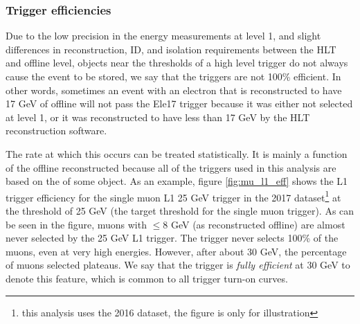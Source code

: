     \subsubsection{Trigger efficiencies} \label{sec:trigger_efficiencies}
    Due to the low precision in the energy measurements at level 1, and slight differences in reconstruction, ID, and isolation requirements between the HLT and offline level, objects near the \pt thresholds of a high level trigger do not always cause the event to be stored, we say that the triggers are not 100\% efficient. In other words, sometimes an event with an electron that is reconstructed to have 17 GeV of \pt offline will not pass the Ele17 trigger because it was either not selected at level 1, or it was reconstructed to have less \pt than 17 GeV by the HLT reconstruction software.

    The rate at which this occurs can be treated statistically. It is mainly a function of the offline reconstructed \pt because all of the triggers used in this analysis are based on the \pt of some object. As an example, figure \ref{fig:mu_l1_eff} shows the L1 trigger efficiency for the single muon L1 25 GeV trigger in the 2017 dataset\footnote{this analysis uses the 2016 dataset, the figure is only for illustration} at the \pt threshold of 25 GeV (the target threshold for the single muon trigger). As can be seen in the figure, muons with \pt $\le 8$ GeV (as reconstructed offline) are almost never selected by the 25 GeV L1 trigger. The trigger never selects 100\% of the muons, even at very high energies. However, after about 30 GeV, the percentage of muons selected plateaus. We say that the trigger is \emph{fully efficient} at 30 GeV to denote this feature, which is common to all trigger turn-on curves.


